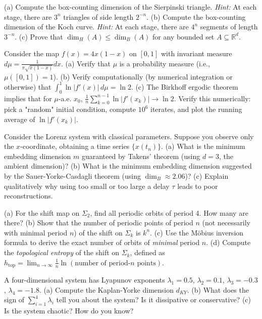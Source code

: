 \begin{exercise}
(a) Compute the box-counting dimension of the Sierpinski triangle. \textit{Hint:} At each stage, there are $3^n$ triangles of side length $2^{-n}$.
(b) Compute the box-counting dimension of the Koch curve. \textit{Hint:} At each stage, there are $4^n$ segments of length $3^{-n}$.
(c) Prove that $\dim_H(A) \leq \dim_B(A)$ for any bounded set $A \subseteq \mathbb{R}^d$.
\end{exercise}


\begin{exercise}
Consider the map $f(x) = 4x(1-x)$ on $[0,1]$ with invariant measure $d\mu = \frac{1}{\pi\sqrt{x(1-x)}} dx$.
(a) Verify that $\mu$ is a probability measure (i.e., $\mu([0,1]) = 1$).
(b) Verify computationally (by numerical integration or otherwise) that $\int_0^1 \ln|f'(x)| \, d\mu = \ln 2$.
(c) The Birkhoff ergodic theorem implies that for $\mu$-a.e. $x_0$, $\frac{1}{n}\sum_{k=0}^{n-1}\ln|f'(x_k)| \to \ln 2$. Verify this numerically: pick a "random" initial condition, compute $10^6$ iterates, and plot the running average of $\ln|f'(x_k)|$.
\end{exercise}


\begin{exercise}
Consider the Lorenz system with classical parameters. Suppose you observe only the $x$-coordinate, obtaining a time series $\{x(t_n)\}$.
(a) What is the minimum embedding dimension $m$ guaranteed by Takens' theorem (using $d = 3$, the ambient dimension)?
(b) What is the minimum embedding dimension suggested by the Sauer-Yorke-Casdagli theorem (using $\dim_B \approx 2.06$)?
(c) Explain qualitatively why using too small or too large a delay $\tau$ leads to poor reconstructions.
\end{exercise}


\begin{exercise}
(a) For the shift map on $\Sigma_2$, find all periodic orbits of period 4. How many are there?
(b) Show that the number of periodic points of period $n$ (not necessarily with minimal period $n$) of the shift on $\Sigma_k$ is $k^n$.
(c) Use the Möbius inversion formula to derive the exact number of orbits of \textit{minimal} period $n$.
(d) Compute the \textit{topological entropy} of the shift on $\Sigma_k$, defined as $h_{\text{top}} = \lim_{n \to \infty} \frac{1}{n} \ln (\text{number of period-}n \text{ points})$.
\end{exercise}


\begin{exercise}
A four-dimensional system has Lyapunov exponents $\lambda_1 = 0.5$, $\lambda_2 = 0.1$, $\lambda_3 = -0.3$, $\lambda_4 = -1.8$.
(a) Compute the Kaplan-Yorke dimension $d_{KY}$.
(b) What does the sign of $\sum_{i=1}^4 \lambda_i$ tell you about the system? Is it dissipative or conservative?
(c) Is the system chaotic? How do you know?
\end{exercise}



